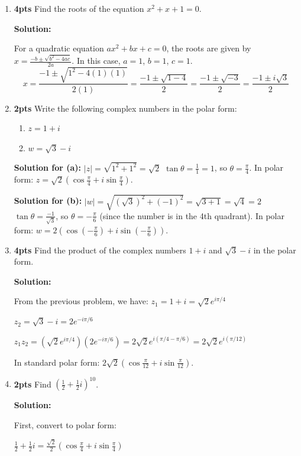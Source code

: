 \documentclass[nohyper,nobib,xcolor=dvipsnames,svgnames,x11names]{tufte-book}
\begin{document}
\begin{enumerate}
    \item \textbf{4pts} Find the roots of the equation $x^2+x+1=0$.

\textbf{Solution:}    
    
    For a quadratic equation $ax^2+bx+c=0$, the roots are given by $x=\frac{-b\pm\sqrt{b^2-4ac}}{2a}$.
    In this case, $a=1$, $b=1$, $c=1$.
    $$x = \frac{-1\pm\sqrt{1^2-4(1)(1)}}{2(1)} = \frac{-1\pm\sqrt{1-4}}{2} = \frac{-1\pm\sqrt{-3}}{2} = \frac{-1\pm i\sqrt{3}}{2}$$

    \item \textbf{2pts} Write the following complex numbers in the polar form:
    \begin{enumerate}
        \item $z=1+i$
        \item $w=\sqrt{3}-i$
    \end{enumerate}
    \textbf{Solution for (a):}
    $|z|=\sqrt{1^2+1^2}=\sqrt{2}$
    $\tan\theta = \frac{1}{1}=1$, so $\theta = \frac{\pi}{4}$.
    In polar form: $z=\sqrt{2}(\cos\frac{\pi}{4}+i\sin\frac{\pi}{4})$.

    \textbf{Solution for (b):}
    $|w|=\sqrt{(\sqrt{3})^2+(-1)^2}=\sqrt{3+1}=\sqrt{4}=2$
    $\tan\theta = \frac{-1}{\sqrt{3}}$, so $\theta = -\frac{\pi}{6}$ (since the number is in the 4th quadrant).
    In polar form: $w=2(\cos(-\frac{\pi}{6})+i\sin(-\frac{\pi}{6}))$.

    \item \textbf{4pts} Find the product of the complex numbers $1+i$ and $\sqrt{3}-i$ in the polar form.
    
    \textbf{Solution:}
    
    From the previous problem, we have:
    $z_1 = 1+i = \sqrt{2}e^{i\pi/4}$
    
    $z_2 = \sqrt{3}-i = 2e^{-i\pi/6}$
    
    $z_1z_2 = (\sqrt{2}e^{i\pi/4})(2e^{-i\pi/6}) = 2\sqrt{2}e^{i(\pi/4-\pi/6)} = 2\sqrt{2}e^{i(\pi/12)}$
    
    In standard polar form: $2\sqrt{2}(\cos\frac{\pi}{12}+i\sin\frac{\pi}{12})$.

    \item \textbf{2pts} Find $(\frac{1}{2}+\frac{1}{2}i)^{10}$.

\textbf{Solution:}    
    
    First, convert to polar form:
    
    $\frac{1}{2}+\frac{1}{2}i = \frac{\sqrt{2}}{2}(\cos\frac{\pi}{4}+i\sin\frac{\pi}{4})$
    

\end{enumerate}
\end{document}
